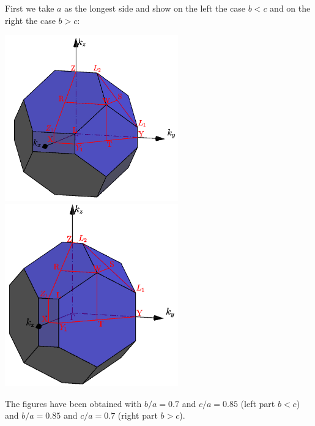 \documentclass[12pt,a4paper]{article}
\begin{document}
First we take $a$ as the longest side and show
on the left the case $b<c$ and on the right the case $b>c$:
\begin{center}
\includegraphics[width=7.5cm,angle=0]{images/bco_4.png} \hspace{1.0cm}
\includegraphics[width=7.5cm,angle=0]{images/bco_5.png}
\end{center}
The figures have been obtained with $b/a=0.7$ and $c/a=0.85$ (left part
$b<c$) and $b/a=0.85$ and $c/a=0.7$ (right part $b>c$).
\end{document}
